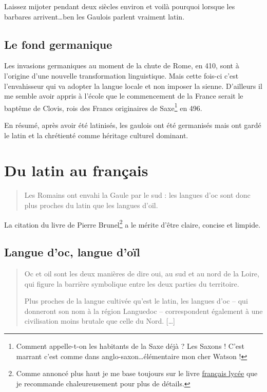 Laissez mijoter pendant deux siècles environ et voilà pourquoi lorsque
les barbares arrivent\dots ben les Gaulois parlent vraiment latin.

\subsection{Le fond germanique}\label{subsec:germ}

Les invasions germaniques au moment de la chute de Rome, en 410, sont
à l'origine d'une nouvelle transformation linguistique. Mais cette
fois-ci c'est l'envahisseur qui va adopter la langue locale et non
imposer la sienne. D'ailleurs il me semble avoir appris à l'école que
le commencement de la France serait le baptême de Clovis, rois des
Francs originaires de Saxe\footnote{Comment appelle-t-on les habitants
de la Saxe déjà ? Les Saxons ! C'est marrant c'est comme dans
anglo-saxon\dots élémentaire mon cher Watson !} en 496.\par
En résumé, après avoir été latinisés, les gaulois ont été germanisés
mais ont gardé le latin et la chrétienté comme héritage culturel
dominant.

\section{Du latin au français}\label{sec:lat2fr}

\begin{quote}
  Les Romains ont envahi la Gaule par le sud : les langues d'oc sont
  donc plus proches du latin que les langues d'oïl.
\end{quote}

La citation du livre de Pierre Brunel\footnote{Comme annoncé plus haut
je me base toujours sur le livre \href{https://www.amazon.fr/gp/product/2844100015/ref=as\_li\_tl?ie=UTF8\&camp=1642\&creative=6746\&creativeASIN=2844100015\&linkCode=as2\&tag=wwwbecomefree-21\&linkId=985f3a849fd44728e8480993cf2d5490}{français
  lycée} que je recommande chaleureusement pour plus de détails.} a le
mérite d'être claire, concise et limpide.

\subsection{Langue d'oc, langue d'oïl}\label{subsec:langOcOil}

\begin{quotation}
  Oc et oil sont les deux manières de dire oui, au sud et au nord de
  la Loire, qui figure la barrière symbolique entre les deux parties
  du territoire.\par
  Plus proches de la langue cultivée qu'est le latin, les langues d'oc
  -- qui donneront son nom à la région Languedoc -- correspondent
  également à une civilisation moins brutale que celle du Nord. [\dots]
\end{quotation}

